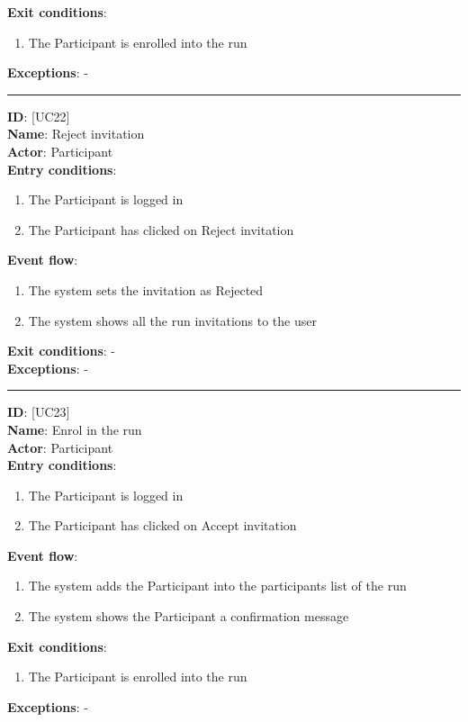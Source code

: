 \documentclass[a4paper, hidelinks, 12pt]{report}
\newcommand\usecase[1]{ [UC#1] }
\begin{document}
\begin{itemize}
		\textbf{Exit conditions}:
		\begin{enumerate}
			\item{The Participant is enrolled into the run}
		\end{enumerate}
		\textbf{Exceptions}: - \\
		\rule{\linewidth}{0.4pt}
		\textbf{ID}: \usecase{22} \\
		\textbf{Name}: Reject invitation \\
		\textbf{Actor}: Participant \\
		\textbf{Entry conditions}:
		\begin{enumerate}
			\item{The Participant is logged in}
			\item{The Participant has clicked on Reject invitation}
		\end{enumerate}
		\textbf{Event flow}:
		\begin{enumerate}
			\item{The system sets the invitation as Rejected}
			\item{The system shows all the run invitations to the user}
		\end{enumerate}
		\textbf{Exit conditions}: - \\
		\textbf{Exceptions}: - \\
		\rule{\linewidth}{0.4pt}
		\textbf{ID}: \usecase{23} \\
		\textbf{Name}: Enrol in the run \\
		\textbf{Actor}: Participant \\
		\textbf{Entry conditions}:
		\begin{enumerate}
			\item{The Participant is logged in}
			\item{The Participant has clicked on Accept invitation}
		\end{enumerate}
		\textbf{Event flow}:
		\begin{enumerate}
			\item{The system adds the Participant into the participants list of the run}
			\item{The system shows the Participant a confirmation message}
		\end{enumerate}
		\textbf{Exit conditions}:
		\begin{enumerate}
			\item{The Participant is enrolled into the run}
		\end{enumerate}
		\textbf{Exceptions}: - \\

\end{itemize}
\end{document}
